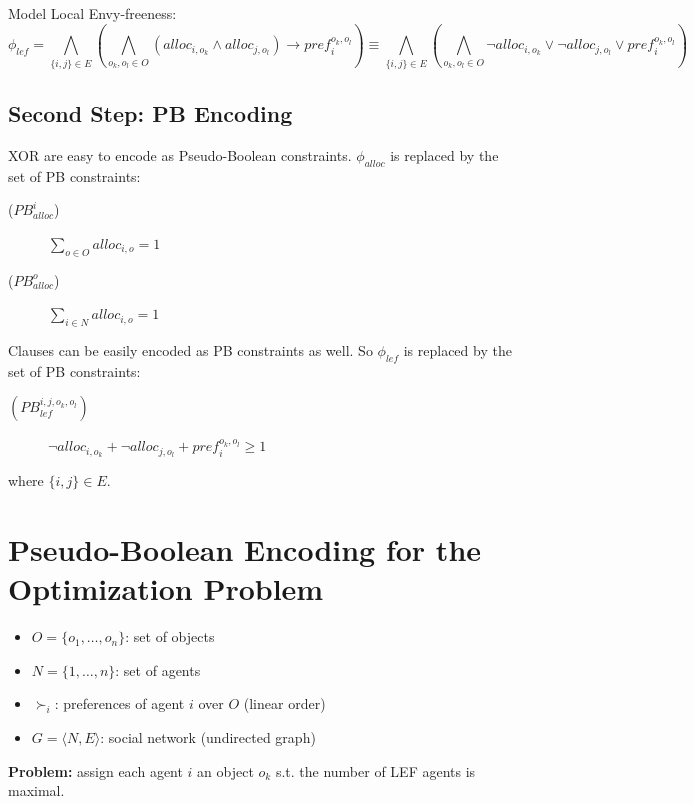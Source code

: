 \documentclass{article}
\begin{document}
Model Local Envy-freeness:
\[
\phi_{lef} = \bigwedge_{\{i,j\} \in E} (\bigwedge_{o_k,o_l \in O} (alloc_{i,o_k} \wedge alloc_{j,o_l}) \rightarrow pref_i^{o_k,o_l}) \equiv \bigwedge_{\{i,j\} \in E} (\bigwedge_{o_k,o_l \in O} \neg alloc_{i,o_k} \vee \neg alloc_{j,o_l} \vee pref_i^{o_k,o_l})
\]

\subsection{Second Step: PB Encoding}
XOR are easy to encode as Pseudo-Boolean constraints. $\phi_{alloc}$ is replaced by the set of PB constraints:
\begin{description}
	\item[($PB_{alloc}^{i}$)] $\sum_{o \in O} alloc_{i,o} = 1$
	\item[($PB_{alloc}^{o}$)] $\sum_{i \in N} alloc_{i,o} = 1$
\end{description}

Clauses can be easily encoded as PB constraints as well. So $\phi_{lef}$ is replaced by the set of PB constraints:
\begin{description}
	\item[$(PB_{lef}^{i,j,o_k,o_l})$] $\neg alloc_{i,o_k} + \neg alloc_{j,o_l} + pref_i^{o_k,o_l} \geq 1$
\end{description}
where $\{i,j\} \in E$.

\section{Pseudo-Boolean Encoding for the Optimization Problem}
\begin{itemize}
	\item $O = \{o_1, \dots, o_n\}$: set of objects
	\item $N = \{1,\dots,n\}$: set of agents
	\item $\succ_i$: preferences of agent $i$ over $O$ (linear order)
	\item $G = \langle N, E\rangle$: social network (undirected graph)
\end{itemize}
{\bf Problem:} assign each agent $i$ an object $o_k$ s.t. the number of LEF agents is maximal.
\end{document}
